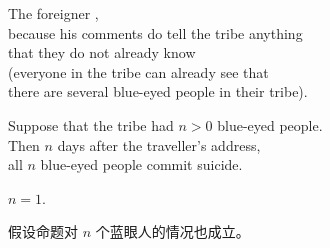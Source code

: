 \begin{frame}{}
  \begin{center}
    The foreigner , \pause \\[6pt]
    because his comments do  tell the tribe anything \\[6pt]
    that they do not already know \pause \\[15pt]
    (everyone in the tribe can already see that \\[6pt]
    there are several blue-eyed people in their tribe).
  \end{center}
\end{frame}

\begin{frame}{}
  \begin{center}

    \pause
    \vspace{0.80cm}
    \begin{theorem}
      \begin{center}
        Suppose that the tribe had $n > 0$ blue-eyed people. \\[6pt]
        Then $n$ days after the traveller's address, \\[6pt]
        all $n$ blue-eyed people commit suicide.
      \end{center}
    \end{theorem}
  \end{center}
\end{frame}

\begin{frame}{}
  \begin{center}

    \pause
    \vspace{0.80cm}
    \begin{description}
      \setlength{\itemsep}{8pt}
      \item[基础步骤:] $n = 1$. \\
      \item[归纳假设:] 假设命题对 $n$ 个蓝眼人的情况也成立。
      \item[归纳步骤:]
    \end{description}
  \end{center}
\end{frame}
